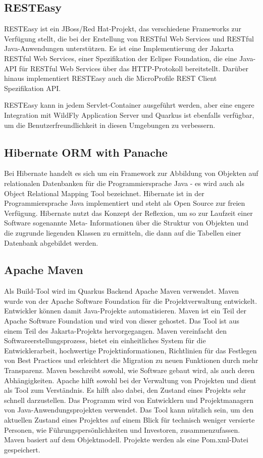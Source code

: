 \subsection{RESTEasy}

RESTEasy ist ein JBoss/Red Hat-Projekt, das verschiedene Frameworks zur Verfügung stellt, die bei der Erstellung von RESTful Web Services und RESTful Java-Anwendungen unterstützen. 
Es ist eine Implementierung der Jakarta RESTful Web Services, einer Spezifikation der Eclipse Foundation, die eine Java-API für RESTful Web Services über das HTTP-Protokoll bereitstellt.
Darüber hinaus implementiert RESTEasy auch die MicroProfile REST Client Spezifikation API.

RESTEasy kann in jedem Servlet-Container ausgeführt werden, aber eine engere Integration mit WildFly Application Server und Quarkus 
ist ebenfalls verfügbar, um die Benutzerfreundlichkeit in diesen Umgebungen zu verbessern.
\cite{sysarch-quarkus-2}

\subsection{Hibernate ORM with Panache}

Bei Hibernate handelt es sich um ein Framework zur Abbildung von Objekten auf relationalen Datenbanken für die Programmiersprache Java - es wird auch als Object Relational Mapping Tool bezeichnet. 
Hibernate ist in der Programmiersprache Java implementiert und steht als Open Source zur freien Verfügung. Hibernate nutzt das Konzept der Reflexion, um so zur Laufzeit einer Software sogenannte 
Meta- Informationen über die Struktur von Objekten und die zugrunde liegenden Klassen zu ermitteln, die dann auf die Tabellen einer Datenbank abgebildet werden.
\cite{sysarch-quarkus-3}

\subsection{Apache Maven}

Als Build-Tool wird im Quarkus Backend Apache Maven verwendet. Maven wurde von der Apache Software Foundation für die Projektverwaltung entwickelt. 
Entwickler können damit Java-Projekte automatisieren. Maven ist ein Teil der Apache Software Foundation und wird von dieser gehostet. 
Das Tool ist aus einem Teil des Jakarta-Projekts hervorgegangen. Maven vereinfacht den Softwareerstellungsprozess, bietet ein einheitliches System für die Entwicklerarbeit, hochwertige Projektinformationen, 
Richtlinien für das Festlegen von Best Practices und erleichtert die Migration zu neuen Funktionen durch mehr Transparenz. Maven beschreibt sowohl, wie Software gebaut wird, als auch deren Abhängigkeiten. 
Apache hilft sowohl bei der Verwaltung von Projekten und dient als Tool zum Verständnis. Es hilft also dabei, den Zustand eines Projekts sehr schnell darzustellen.
Das Programm wird von Entwicklern und Projektmanagern von Java-Anwendungsprojekten verwendet. Das Tool kann nützlich sein, um den aktuellen Zustand eines Projektes 
auf einem Blick für technisch weniger versierte Personen, wie Führungspersönlichkeiten und Investoren, zusammenzufassen. Maven basiert auf dem Objektmodell. 
Projekte werden als eine Pom.xml-Datei gespeichert. 

